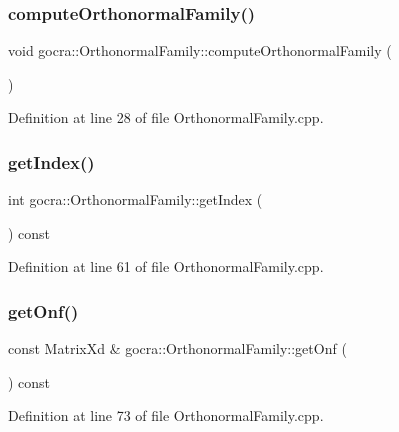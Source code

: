\subsubsection{\texorpdfstring{compute\+Orthonormal\+Family()}{computeOrthonormalFamily()}}
{\footnotesize\ttfamily void gocra\+::\+Orthonormal\+Family\+::compute\+Orthonormal\+Family (\begin{DoxyParamCaption}{ }\end{DoxyParamCaption})}



Definition at line 28 of file Orthonormal\+Family.\+cpp.

\hypertarget{classgocra_1_1OrthonormalFamily_a1d357fcc1881e4c828802164e0396272}{}\label{classgocra_1_1OrthonormalFamily_a1d357fcc1881e4c828802164e0396272} 
\subsubsection{\texorpdfstring{get\+Index()}{getIndex()}}
{\footnotesize\ttfamily int gocra\+::\+Orthonormal\+Family\+::get\+Index (\begin{DoxyParamCaption}{ }\end{DoxyParamCaption}) const}



Definition at line 61 of file Orthonormal\+Family.\+cpp.

\hypertarget{classgocra_1_1OrthonormalFamily_a4b44820fa67f54c9a8c65d618ff85f38}{}\label{classgocra_1_1OrthonormalFamily_a4b44820fa67f54c9a8c65d618ff85f38} 
\subsubsection{\texorpdfstring{get\+Onf()}{getOnf()}}
{\footnotesize\ttfamily const Matrix\+Xd \& gocra\+::\+Orthonormal\+Family\+::get\+Onf (\begin{DoxyParamCaption}{ }\end{DoxyParamCaption}) const}



Definition at line 73 of file Orthonormal\+Family.\+cpp.

\hypertarget{classgocra_1_1OrthonormalFamily_a5b1a38bfce734095c80d824add5fa1b3}{}\label{classgocra_1_1OrthonormalFamily_a5b1a38bfce734095c80d824add5fa1b3} 
